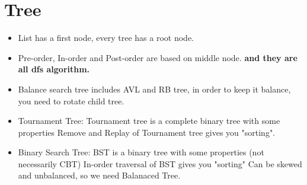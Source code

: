 \documentclass[a4paper,12pt,twoside]{book}
\begin{document}
\section{Tree}
\begin{itemize}
\item List has a first node, every tree has a root node. 

\item Pre-order, In-order and Post-order are based on middle node. \textbf{and they are all dfs algorithm.}

\item Balance search tree includes AVL and RB tree, in order to keep it balance, you need to rotate child tree. 

\item Tournament Tree: Tournament tree is a complete binary tree with some properties
Remove and  Replay of Tournament tree gives you "sorting".

\item Binary Search Tree: BST is a binary tree with some properties (not necessarily CBT)
In-order traversal of BST gives you "sorting" Can be skewed and unbalanced, so we need Balanaced Tree.

\end{itemize}
 
\end{document}
